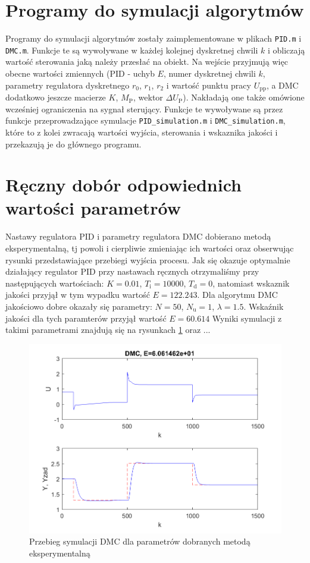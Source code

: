 \section{Programy do symulacji algorytmów}
Programy do symulacji algorytmów zostały zaimplementowane w plikach \texttt{PID.m} i \texttt{DMC.m}. Funkcje te są wywoływane w każdej kolejnej dyskretnej chwili $k$ i obliczają wartość sterowania jaką należy przesłać na obiekt. Na wejście przyjmują więc obecne wartości zmiennych (PID - uchyb $E$, numer dyskretnej chwili $k$, parametry regulatora dyskretnego $r_{\mathrm{0}}$, $r_{\mathrm{1}}$, $r_{\mathrm{2}}$ i wartość punktu pracy $U_{\mathrm{pp}}$, a DMC dodatkowo jeszcze macierze $K$, $M_{\mathrm{P}}$, wektor $\Delta U_{\mathrm{P}}$). Nakładają one także omówione wcześniej ograniczenia na sygnał sterujący. Funkcje te wywoływane są przez funkcje przeprowadzające symulacje \texttt{PID\_simulation.m} i \texttt{DMC\_simulation.m}, które to z kolei zwracają wartości wyjścia, sterowania i wskaznika jakości i przekazują je do głównego programu.

\section{Ręczny dobór odpowiednich wartości parametrów}
Nastawy regulatora PID i parametry regulatora DMC dobierano metodą eksperymentalną, tj powoli i cierpliwie zmieniając ich wartości oraz obserwując rysunki przedstawiające przebiegi wyjścia procesu. Jak się okazuje optymalnie działający regulator PID przy nastawach ręcznych otrzymaliśmy przy następujących wartościach: $K=\num{0.01}$, $T_\mathrm{i}=10000$, $T_\mathrm{d}=0$, natomiast wskaznik jakości przyjął w tym wypadku wartość $E=\num{122.243}$. Dla algorytmu DMC jakościowo dobre okazały się parametry: $N=50$, $N_\mathrm{u}=1$, $\lambda=\num{1.5}$. Wskaźnik jakości dla tych paramterów przyjął wartość $E=\num{60.614}$  Wyniki symulacji z takimi parametrami znajdują się na rysunkach \ref{dmcinz} oraz ...

\begin{figure}
\label{dmcinz}
\centering
\caption{Przebieg symulacji DMC dla parametrów dobranych metodą eksperymentalną}
\includegraphics{dmc_inz.png}
\end{figure}

